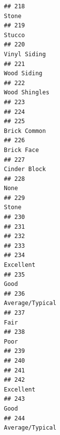 \documentclass[
]{article}
\begin{document}
\begin{verbatim}
## 218                                                                                      Stone
## 219                                                                                     Stucco
## 220                                                                               Vinyl Siding
## 221                                                                                Wood Siding
## 222                                                                              Wood Shingles
## 223                                                                                           
## 224                                                                                           
## 225                                                                               Brick Common
## 226                                                                                 Brick Face
## 227                                                                               Cinder Block
## 228                                                                                       None
## 229                                                                                      Stone
## 230                                                                                           
## 231                                                                                           
## 232                                                                                           
## 233                                                                                           
## 234                                                                                  Excellent
## 235                                                                                       Good
## 236                                                                            Average/Typical
## 237                                                                                       Fair
## 238                                                                                       Poor
## 239                                                                                           
## 240                                                                                           
## 241                                                                                           
## 242                                                                                  Excellent
## 243                                                                                       Good
## 244                                                                            Average/Typical

\end{verbatim}
\end{document}
